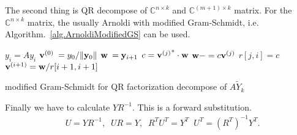 The second thing is QR decompose of $\mathbb{C}^{n\times k}$ and $\mathbb{C}^{(m+1)\times k}$ matrix. For the $\mathbb{C}^{n\times k}$ matrix, the usually Arnoldi with modified Gram-Schmidt, i.e. Algorithm.~\ref{alg.ArnoldiModifiedGS} can be used.
\begin{algorithm}[H]
\begin{algorithmic}
    \State $y_i=Ay_i$
\EndFor
\State ${\bf v}^{(0)}\:=y_0/\|{\bf y}_0\|$
    \State ${\bf w}\:={\bf y}_{i+1}$
        \State $c={{\bf v}^{(j)}}^*\cdot {\bf w}$
        \State ${\bf w}-=c{\bf v}^{(j)}$
        \State $r[j,i]=c$
    \EndFor
    \State ${\bf v}^{(i+1)}={\bf w}/r[i+1,i+1]$
\EndFor

\end{algorithmic}
\caption{modified Gram-Schmidt for QR factorization decompose of $A\tilde{Y}_k$}
\end{algorithm}

Finally we have to calculate $YR^{-1}$. This is a forward substitution.
\begin{equation}
\begin{split}
&U=YR^{-1},\;\; UR=Y,\;\;R^{T}U^{T}=Y^T\;\;U^{T}=\left(R^{T}\right)^{-1}Y^T.\\
\end{split}
\end{equation}

